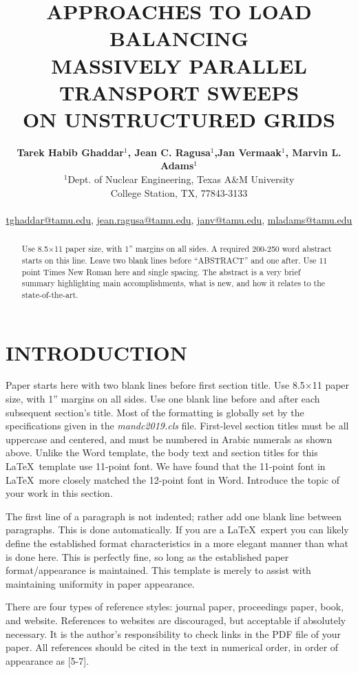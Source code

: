 \documentclass[letterpaper]{mandc2019}
\title{APPROACHES TO LOAD BALANCING \\
MASSIVELY PARALLEL TRANSPORT SWEEPS \\
 ON UNSTRUCTURED GRIDS}
\author{%
  \textbf{Tarek Habib Ghaddar$^1$, Jean C. Ragusa$^1$,Jan Vermaak$^1$, Marvin L. Adams$^1$}\\%
  $^1$Dept. of Nuclear Engineering, Texas  A\&M University \\
  College Station, TX, 77843-3133 \\ 
\\
  \url{tghaddar@tamu.edu}, \url{jean.ragusa@tamu.edu}, \url{janv@tamu.edu}, \url{mladams@tamu.edu}
}
\begin{document}
\maketitle
\justify 

\begin{abstract}
  Use 8.5$\times$11 paper size, with 1'' margins on all sides.  A required 200-250 
  word abstract starts on this line.  Leave two blank lines before ``ABSTRACT''
  and one after.  Use 11 point Times New Roman here and single 
  spacing. The abstract is a very brief summary highlighting main 
  accomplishments, what is new, and how it relates to the state-of-the-art.
\end{abstract}

\section{INTRODUCTION} 
Paper starts here with two blank lines before first section title.  Use 
8.5$\times$11 paper size, with 1'' margins on all sides.  Use one blank line 
before and after each subsequent section’s title.  Most of the formatting is globally
set by the specifications given in the \emph{mandc2019.cls} file.  
First-level section titles must be all uppercase and centered, and must 
be numbered in Arabic numerals as shown above.  Unlike the Word template, the body text and section titles for this \LaTeX\ template use 
11-point font.  We have found that the 11-point font in \LaTeX\ more closely 
matched the 12-point font in Word.  Introduce the topic of your work 
in this section.

The first line of a paragraph is not indented; rather add one blank line between 
paragraphs.  This is done automatically. If you are a \LaTeX\ expert you 
can likely define the established format characteristics in a more elegant 
manner than what is done here.  This is perfectly fine, so long as the 
established paper format/appearance is maintained.  This template is merely 
to assist with maintaining uniformity in paper appearance.

There are four types of reference styles: journal paper\cite{journal}, 
proceedings paper\cite{proc_paper}, book\cite{book}, and website\cite{website}.
References to websites are discouraged, but acceptable if absolutely necessary. It 
is the author’s responsibility to check links in the PDF file of your paper. 
All references should be cited in the text in numerical order, in order of 
appearance as [5-7].
\end{document}
